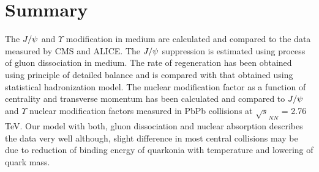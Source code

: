 \documentclass[aps,prc,preprint,superscriptaddress,showpacs,showkeys]{revtex4-1}
\begin{document}
\section{Summary}
 The $J/\psi$ and $\Upsilon$ modification in medium are calculated and compared to the data
measured by CMS and ALICE.
  The $J/\psi$ suppression is estimated using process of gluon dissociation in medium. The rate of regeneration 
has been obtained using principle of detailed balance and is compared with that obtained using statistical 
hadronization model. 
The nuclear modification factor as a function of centrality and transverse momentum has been calculated  
and compared to $J/\psi$ and $\Upsilon$ nuclear modification factors measured in PbPb collisions 
at $\sqrt s_{NN}$ =  2.76 TeV.
  Our model with both, gluon dissociation and nuclear absorption describes the data very well although, 
slight difference in most central collisions may be due to reduction of binding energy of quarkonia with 
temperature and lowering of quark mass.
\end{document}
